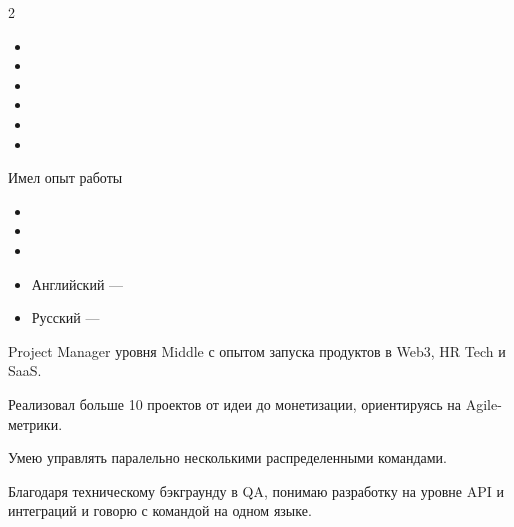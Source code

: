 \documentclass[10pt,a4paper,ragged2e,withhyper]{custom-altacv}
\begin{document}
\begin{paracol}{2}

\vspace{2ex}

\begin{itemize}
	\item {}   
	\item {}    
    \item {}  
	\item {}   
    \item {} 
    \item {}

\end{itemize}

\divider

\textcolor{emphasis}{Имел опыт работы}
\vspace{2ex}

\begin{itemize}
	\item {} 
	\item  {}
	\item  {}  


\end{itemize}




\begin{itemize}
	\item Английский --- 
    \item Русский    --- 
\end{itemize}


Project Manager  уровня Middle с опытом запуска продуктов в Web3, HR Tech и SaaS.
 
\item  Реализовал больше 10 проектов от идеи до монетизации, ориентируясь на Agile-метрики.
\item  Умею управлять паралельно несколькими распределенными командами.
\item   Благодаря техническому бэкграунду в QA, понимаю разработку на уровне API и интеграций и говорю с командой на одном языке. 
	
\end{paracol}
\end{document}
